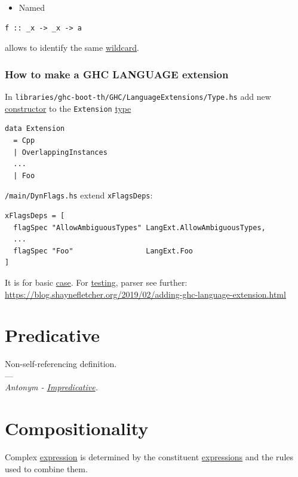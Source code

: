 \documentclass[a4paper,14pt,oneside]{book}
\begin{document}
\begin{itemize}
\item Named\\
\end{itemize}
\begin{verbatim}
f :: _x -> _x -> a
\end{verbatim}
allows to identify the same \hyperref[org1fba691]{wildcard}.\\

\subsection{How to make a GHC LANGUAGE extension}
\label{sec:org4453b4d}

In \texttt{libraries/ghc-boot-th/GHC/LanguageExtensions/Type.hs} add new \hyperref[org8c6d9a8]{constructor} to the \texttt{Extension} \hyperref[orgd6db20c]{type}\\
\begin{verbatim}
data Extension
  = Cpp
  | OverlappingInstances
  ...
  | Foo
\end{verbatim}

\texttt{/main/DynFlags.hs} extend \texttt{xFlagsDeps}:\\
\begin{verbatim}
xFlagsDeps = [
  flagSpec "AllowAmbiguousTypes" LangExt.AllowAmbiguousTypes,
  ...
  flagSpec "Foo"                 LangExt.Foo
]
\end{verbatim}
It is for basic \hyperref[orge2ba09c]{case}. For \hyperref[orgb234d91]{testing}, parser see further: \url{https://blog.shaynefletcher.org/2019/02/adding-ghc-language-extension.html}\\

\chapter{\label{org2fea54f}Predicative}
\label{sec:org9ff6da1}
Non-self-referencing definition.\\

---\\

\emph{Antonym - \hyperref[org02560f4]{Impredicative}.}\\

\chapter{\label{orgee3aef3}Compositionality}
\label{sec:org3d42d5b}
Complex \hyperref[org6aa6989]{expression} is determined by the constituent \hyperref[org8896d2c]{expressions} and the rules used to combine them.\\
\end{document}
